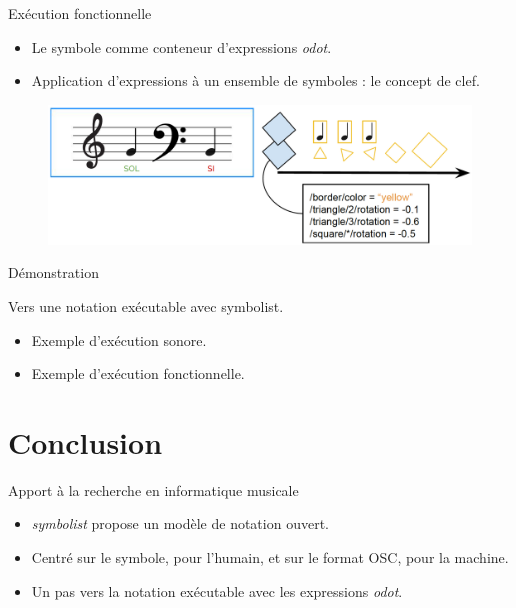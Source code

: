\documentclass[pdf]{beamer}
\begin{document}
\begin{frame}{Exécution fonctionnelle}
	\begin{itemize}[label=$\square$]
		\item Le symbole comme conteneur d'expressions \textit{odot}.
		\item Application d'expressions à un ensemble de symboles : le concept de clef.
	\end{itemize}
	\begin{figure}
		\centering
		\includegraphics[keepaspectratio=true, width=\textwidth]{./medias/conceptDeClef.png}
	\end{figure}
\end{frame}

\begin{frame}{Démonstration}
\begin{exampleblock}{Vers une notation exécutable avec symbolist.}
	\begin{itemize}[label={$\square$}]
		\item Exemple d'exécution sonore. 
		\item Exemple d'exécution fonctionnelle.
	\end{itemize}
\end{exampleblock}

\end{frame}

\section{Conclusion}
\begin{frame}{Apport à la recherche en informatique musicale}
 \begin{itemize}[label=$\square$]
 	\item \textit{symbolist} propose un modèle de notation ouvert.
 	\item Centré sur le symbole, pour l'humain, et sur le format OSC, pour la machine.
 	\item Un pas vers la notation exécutable avec les expressions \textit{odot}.
 \end{itemize}
\end{frame}
\end{document}
